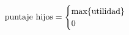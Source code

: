 \documentclass[preview]{standalone}
\begin{document}
\begin{align*}
\text{puntaje hijos} =  \begin{cases} \text{max\{\text{utilidad}\}} \cr 0 \cr \end{cases}
\end{align*}
\end{document}
